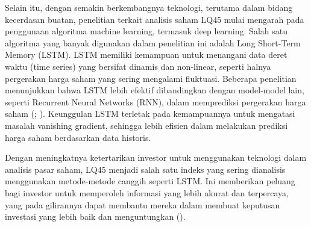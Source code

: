 \begin{subs}
	Selain itu, dengan semakin berkembangnya teknologi, terutama dalam bidang kecerdasan buatan, penelitian terkait analisis saham LQ45 mulai mengarah pada penggunaan algoritma machine learning, termasuk deep learning. Salah satu algoritma yang banyak digunakan dalam penelitian ini adalah Long Short-Term Memory (LSTM). LSTM memiliki kemampuan untuk menangani data deret waktu (time series) yang bersifat dinamis dan non-linear, seperti halnya pergerakan harga saham yang sering mengalami fluktuasi. Beberapa penelitian menunjukkan bahwa LSTM lebih efektif dibandingkan dengan model-model lain, seperti Recurrent Neural Networks (RNN), dalam memprediksi pergerakan harga saham (\cite{chairurrachman2022penerapan}; \cite{alim2023pemodelan}). Keunggulan LSTM terletak pada kemampuannya untuk mengatasi masalah vanishing gradient, sehingga lebih efisien dalam melakukan prediksi harga saham berdasarkan data historis.

  Dengan meningkatnya ketertarikan investor untuk menggunakan teknologi dalam analisis pasar saham, LQ45 menjadi salah satu indeks yang sering dianalisis menggunakan metode-metode canggih seperti LSTM. Ini memberikan peluang bagi investor untuk memperoleh informasi yang lebih akurat dan terpercaya, yang pada gilirannya dapat membantu mereka dalam membuat keputusan investasi yang lebih baik dan menguntungkan (\cite{pipin2023deep}).
\end{subs}


